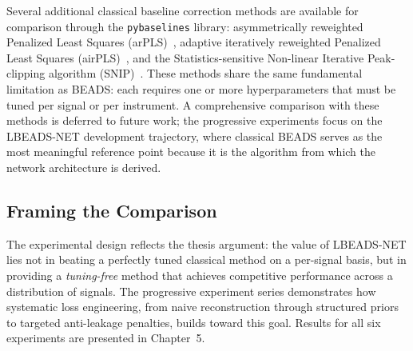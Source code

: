 Several additional classical baseline correction methods are available for comparison through the \texttt{pybaselines} library: asymmetrically reweighted Penalized Least Squares (arPLS)~\cite{baek2015arpls}, adaptive iteratively reweighted Penalized Least Squares (airPLS)~\cite{zhang2010airpls}, and the Statistics-sensitive Non-linear Iterative Peak-clipping algorithm (SNIP)~\cite{morhac2008snip}. These methods share the same fundamental limitation as BEADS: each requires one or more hyperparameters that must be tuned per signal or per instrument. A comprehensive comparison with these methods is deferred to future work; the progressive experiments focus on the LBEADS-NET development trajectory, where classical BEADS serves as the most meaningful reference point because it is the algorithm from which the network architecture is derived.


\subsection{Framing the Comparison}
\label{sec:exp_framing}

The experimental design reflects the thesis argument: the value of LBEADS-NET lies not in beating a perfectly tuned classical method on a per-signal basis, but in providing a \emph{tuning-free} method that achieves competitive performance across a distribution of signals. The progressive experiment series demonstrates how systematic loss engineering, from naive reconstruction through structured priors to targeted anti-leakage penalties, builds toward this goal. Results for all six experiments are presented in Chapter~5.
